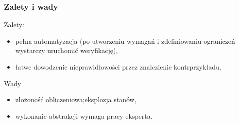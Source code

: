\subsubsection{Zalety i wady}

Zalety:

\begin{itemize}
	\item pełna automatyzacja (po utworzeniu wymagań i zdefiniowaniu ograniczeń wystarczy uruchomić weryfikację),
	\item łatwe dowodzenie nieprawidłowości przez znalezienie kontrprzykładu.
\end{itemize}

Wady

\begin{itemize}
	\item złożoność obliczeniowa;eksplozja stanów,
	\item wykonanie abstrakcji wymaga pracy eksperta.
\end{itemize}
